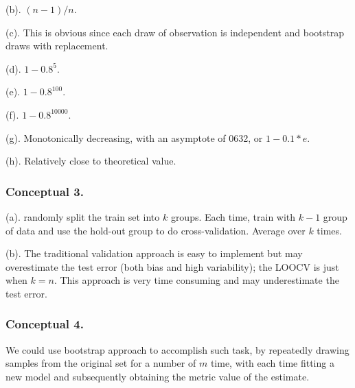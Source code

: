 (b). $(n-1)/n$.

(c). This is obvious since each draw of observation is independent and bootstrap draws with replacement.

(d). $1 - 0.8^5$.

(e). $1 - 0.8^{100}$.

(f). $1 - 0.8^{10000}$.

(g). Monotonically decreasing, with an asymptote of 0632, or $1-0.1*e$.

(h). Relatively close to theoretical value. 

\subsubsection{Conceptual 3.}
(a). randomly split the train set into $k$ groups. Each time, train with $k-1$ group of data and use the hold-out group to do cross-validation. Average over $k$ times.

(b). The traditional validation approach is easy to implement but may overestimate the test error (both bias and high variability); the LOOCV is just when $k=n$. This approach is very time consuming and may underestimate the test error.\\
\subsubsection{Conceptual 4.}
We could use bootstrap approach to accomplish such task, by repeatedly drawing samples from the original set for a number of $m$ time, with each time fitting a new model and subsequently obtaining the metric value of the estimate.
